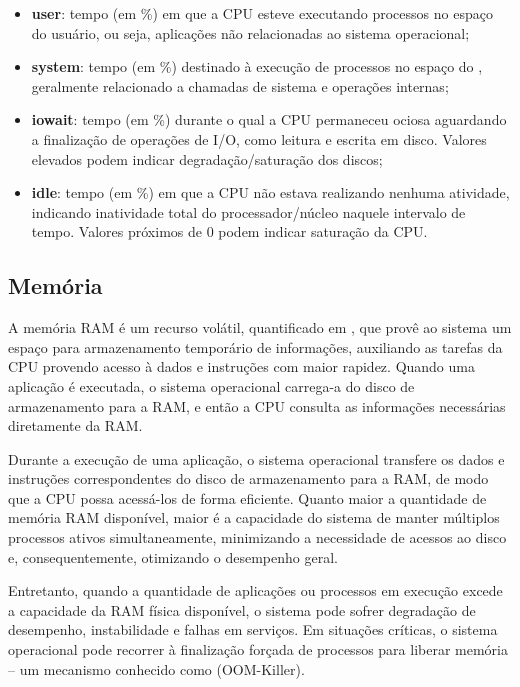 \begin{itemize}
\item \textbf{user}: tempo (em \%) em que a CPU esteve executando processos no espaço do usuário, ou seja, aplicações não relacionadas ao sistema operacional;

\item \textbf{system}: tempo (em \%) destinado à execução de processos no espaço do , geralmente relacionado a chamadas de sistema e operações internas;

\item \textbf{iowait}: tempo (em \%) durante o qual a CPU permaneceu ociosa aguardando a finalização de operações de I/O, como leitura e escrita em disco. Valores elevados podem indicar degradação/saturação dos discos;

\item \textbf{idle}: tempo (em \%) em que a CPU não estava realizando nenhuma atividade, indicando inatividade total do processador/núcleo naquele intervalo de tempo. Valores próximos de 0 podem indicar saturação da CPU.
\end{itemize}

\subsection{Memória}
\label{subsection:Memoria}

A memória RAM \citep{memorymetrics2025} é um recurso volátil, quantificado em , que provê ao sistema um espaço para armazenamento temporário de informações, auxiliando as tarefas da CPU provendo acesso à dados e instruções com maior rapidez. Quando uma aplicação é executada, o sistema operacional carrega-a do disco de armazenamento para a RAM, e então a CPU consulta as informações necessárias diretamente da RAM. 

Durante a execução de uma aplicação, o sistema operacional transfere os dados e instruções correspondentes do disco de armazenamento para a RAM, de modo que a CPU possa acessá-los de forma eficiente. Quanto maior a quantidade de memória RAM disponível, maior é a capacidade do sistema de manter múltiplos processos ativos simultaneamente, minimizando a necessidade de acessos ao disco e, consequentemente, otimizando o desempenho geral.

Entretanto, quando a quantidade de aplicações ou processos em execução excede a capacidade da RAM física disponível, o sistema pode sofrer degradação de desempenho, instabilidade e falhas em serviços. Em situações críticas, o sistema operacional pode recorrer à finalização forçada de processos para liberar memória -- um mecanismo conhecido como  (OOM-Killer).

